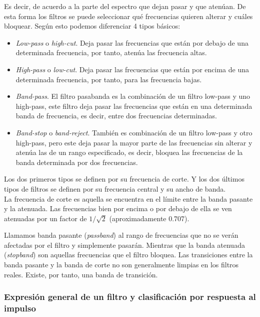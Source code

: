 Es decir, de acuerdo a la parte del espectro que dejan pasar y que atenúan. De esta forma los filtros se puede seleccionar qué frecuencias quieren alterar y cuáles bloquear. Según esto podemos diferenciar 4 tipos básicos:

\begin{itemize}
\item \emph{Low-pass} o \emph{high-cut}. Deja pasar las frecuencias que están por debajo de una determinada frecuencia, por tanto, atenúa las frecuencia altas.
\item \emph{High-pass} o \emph{low-cut}. Deja pasar las frecuencias que están por encima de una determinada frecuencia, por tanto, para las frecuencia bajas.
\item \emph{Band-pass}. El filtro pasabanda es la combinación de un filtro low-pass y uno high-pass, este filtro deja pasar las frecuencias que están en una determinada banda de frecuencia, es decir, entre dos frecuencias determinadas.
\item \emph{Band-stop} o \emph{band-reject}. También es combinación de un filtro low-pass y otro high-pass, pero este deja pasar la mayor parte de las frecuencias sin alterar y atenúa las de un rango especificado, es decir, bloquea las frecuencias de la banda determinada por dos frecuencias.
\end{itemize}

Los dos primeros tipos se definen por su frecuencia de corte. Y los dos últimos tipos de filtros se definen por su frecuencia central y su ancho de banda.\\

La frecuencia de corte es aquella se encuentra en el límite entre la banda pasante y la atenuada. Las frecuencias bien por encima o por debajo de ella se ven atenuadas por un factor de $1/ \sqrt{2}$ (aproximadamente 0.707). 

Llamamos banda pasante (\emph{passband}) al rango de frecuencias que no se verán afectadas por el filtro y simplemente pasarán. Mientras que la banda atenuada (\emph{stopband}) son aquellas frecuencias que el filtro bloquea. Las transiciones entre la banda pasante y la banda de corte no son generalmente limpias en los filtros reales. Existe, por tanto, una banda de transición.

\subsubsection{Expresión general de un filtro y clasificación por respuesta al impulso}

